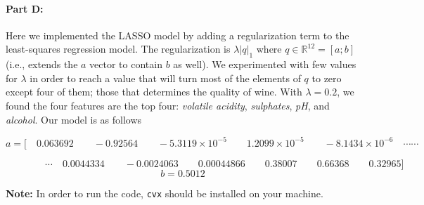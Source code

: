 \paragraph{Part D:}
Here we implemented the LASSO model by adding a regularization term to the least-squares regression model. The regularization is $\lambda |q|_{1}$ where $q\in \mathbb{R}^12 = [a;b]$ (i.e., extends the $a$ vector to contain $b$ as well). We experimented with few values for $\lambda$ in order to reach a value that will turn most of the elements of $q$ to zero except four of them; those that determines the quality of wine. With $\lambda = 0.2$, we found the four features are the top four: \emph{volatile acidity}, \emph{sulphates}, \emph{pH}, and \emph{alcohol}. Our model is as follows 


\begin{footnotesize}
$$
a= \text{[}\quad 0.063692  \qquad  -0.92564 \qquad -5.3119\times 10^{-5}  \qquad   1.2099\times 10^{-5} \qquad -8.1434 \times 10^{-6} \quad  \cdots\cdots
$$

$$
\qquad \qquad  \cdots \quad 0.0044334    \qquad -0.0024063 \qquad   0.00044866       \qquad  0.38007 \qquad    0.66368 \qquad  0.32965 \text{]}
$$
$$
b = 0.5012
$$
\end{footnotesize}



\textbf{Note:} In order to run the code, \texttt{cvx} should be installed on your machine. 